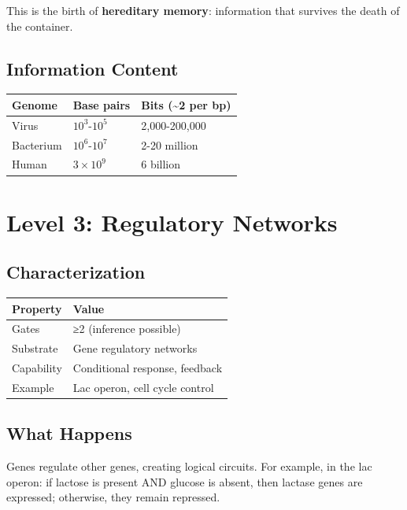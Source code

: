\documentclass[
  11pt,
  letterpaper,
  twoside,
  openright]{book}
\begin{document}
This is the birth of \textbf{hereditary memory}: information that
survives the death of the container.

\subsection{Information Content}\label{information-content}

\begin{longtable}[]{@{}lll@{}}
\toprule\noalign{}
Genome & Base pairs & Bits (\textasciitilde2 per bp) \\
\midrule\noalign{}
\endhead
\bottomrule\noalign{}
\endlastfoot
Virus & \(10^3\)-\(10^5\) & 2,000-200,000 \\
Bacterium & \(10^6\)-\(10^7\) & 2-20 million \\
Human & \(3 \times 10^9\) & 6 billion \\
\end{longtable}

\section{Level 3: Regulatory
Networks}\label{level-3-regulatory-networks}

\subsection{Characterization}\label{characterization-3}

\begin{longtable}[]{@{}ll@{}}
\toprule\noalign{}
Property & Value \\
\midrule\noalign{}
\endhead
\bottomrule\noalign{}
\endlastfoot
Gates & ≥2 (inference possible) \\
Substrate & Gene regulatory networks \\
Capability & Conditional response, feedback \\
Example & Lac operon, cell cycle control \\
\end{longtable}

\subsection{What Happens}\label{what-happens-3}

Genes regulate other genes, creating logical circuits. For example, in
the lac operon: if lactose is present AND glucose is absent, then
lactase genes are expressed; otherwise, they remain repressed.
\end{document}
